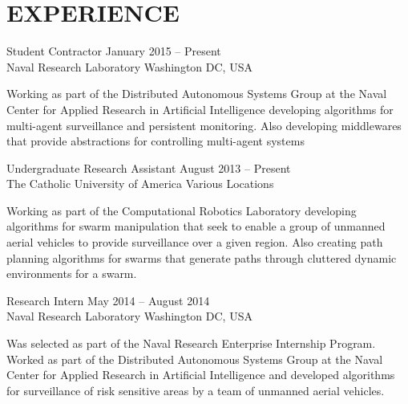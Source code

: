 \documentclass[line,margin]{cv}
\begin{document}
\begin{resume}
\begin{adjustwidth}{2.5em}{2.5em}
\end{adjustwidth}

\section{EXPERIENCE}

Student Contractor
\hfill January 2015 -- Present \\
Naval Research Laboratory \hfill Washington DC, USA

\begin{adjustwidth}{2.5em}{2.5em}

    Working as part of the Distributed Autonomous Systems Group at the Naval
    Center for Applied Research in Artificial Intelligence developing
    algorithms for multi-agent surveillance and persistent monitoring. Also
    developing middlewares that provide abstractions for controlling
    multi-agent systems

\end{adjustwidth}

Undergraduate Research Assistant
\hfill August 2013 -- Present \\
The Catholic University of America \hfill Various Locations

\begin{adjustwidth}{2.5em}{2.5em}

    Working as part of the Computational Robotics Laboratory developing
    algorithms for swarm manipulation that seek to enable a group of unmanned
    aerial vehicles to provide surveillance over a given region. Also creating
    path planning algorithms for swarms that generate paths through cluttered
    dynamic environments for a swarm.

\end{adjustwidth}

Research Intern
\hfill May 2014 -- August 2014 \\
Naval Research Laboratory \hfill Washington DC, USA

\begin{adjustwidth}{2.5em}{2.5em}

    Was selected as part of the Naval Research Enterprise Internship Program.
    Worked as part of the Distributed Autonomous Systems Group at the Naval
    Center for Applied Research in Artificial Intelligence and developed
    algorithms for surveillance of risk sensitive areas by a team of unmanned
    aerial vehicles.

\end{adjustwidth}


\end{resume}
\end{document}
